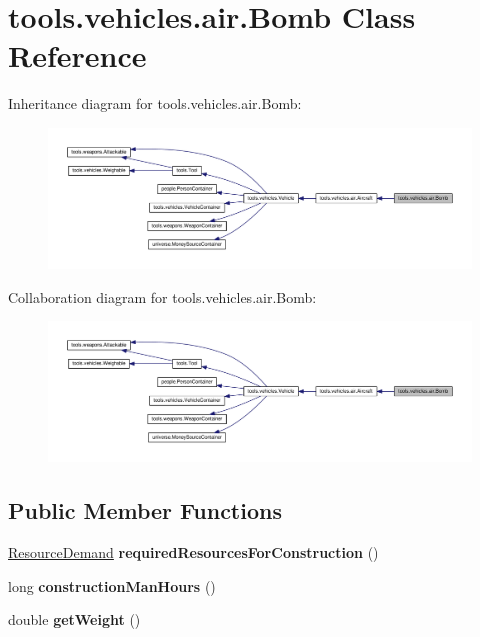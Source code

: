 \hypertarget{classtools_1_1vehicles_1_1air_1_1_bomb}{}\section{tools.\+vehicles.\+air.\+Bomb Class Reference}
\label{classtools_1_1vehicles_1_1air_1_1_bomb}


Inheritance diagram for tools.\+vehicles.\+air.\+Bomb\+:
\nopagebreak
\begin{figure}[H]
\begin{center}
\leavevmode
\includegraphics[width=350pt]{classtools_1_1vehicles_1_1air_1_1_bomb__inherit__graph}
\end{center}
\end{figure}


Collaboration diagram for tools.\+vehicles.\+air.\+Bomb\+:
\nopagebreak
\begin{figure}[H]
\begin{center}
\leavevmode
\includegraphics[width=350pt]{classtools_1_1vehicles_1_1air_1_1_bomb__coll__graph}
\end{center}
\end{figure}
\subsection*{Public Member Functions}
\begin{DoxyCompactItemize}
\item 
\hyperlink{classuniverse_1_1_resource_demand}{Resource\+Demand} {\bfseries required\+Resources\+For\+Construction} ()\hypertarget{classtools_1_1vehicles_1_1air_1_1_bomb_ae03965a4344f4a939c831d124dcacb87}{}\label{classtools_1_1vehicles_1_1air_1_1_bomb_ae03965a4344f4a939c831d124dcacb87}

\item 
long {\bfseries construction\+Man\+Hours} ()\hypertarget{classtools_1_1vehicles_1_1air_1_1_bomb_aeabb34501868104972e905c04eae1470}{}\label{classtools_1_1vehicles_1_1air_1_1_bomb_aeabb34501868104972e905c04eae1470}

\item 
double {\bfseries get\+Weight} ()\hypertarget{classtools_1_1vehicles_1_1air_1_1_bomb_a300a52a9ea7d57722b474247d88620de}{}\label{classtools_1_1vehicles_1_1air_1_1_bomb_a300a52a9ea7d57722b474247d88620de}

\end{DoxyCompactItemize}
